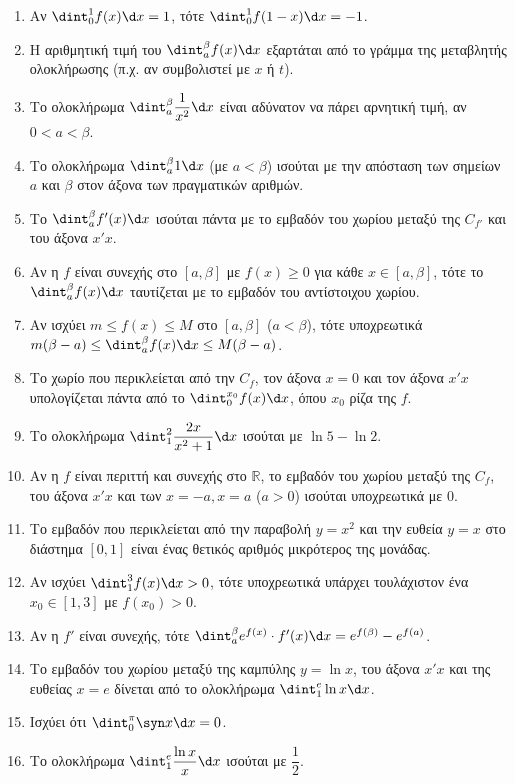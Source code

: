 \begin{enumerate}[label=\textbf{3.\arabic*.}]
    \item Αν $\dint_0^1 f(x)\d x = 1$, τότε $\dint_0^1 f(1-x)\d x = -1$.
    \item Η αριθμητική τιμή του $\dint_{a}^{\beta} f(x) \d x$ εξαρτάται από το γράμμα της μεταβλητής ολοκλήρωσης (π.χ. αν συμβολιστεί με $x$ ή $t$).
    \item Το ολοκλήρωμα $\dint_a^\beta \dfrac{1}{x^2} \d x$ είναι αδύνατον να πάρει αρνητική τιμή, αν $0 < a < \beta$.
    \item Το ολοκλήρωμα $\dint_{a}^{\beta} 1 \d x$ (με $a<\beta$) ισούται με την απόσταση των σημείων $a$ και $\beta$ στον άξονα των πραγματικών αριθμών.
    \item Το $\dint_{a}^{\beta} f'(x) \d x$ ισούται πάντα με το εμβαδόν του χωρίου μεταξύ της $C_{f'}$ και του άξονα $x'x$.
    \item Αν η $f$ είναι συνεχής στο $[a, \beta]$ με $f(x) \ge 0$ για κάθε $x \in [a, \beta]$, τότε το $\dint_a^\beta f(x) \d x$ ταυτίζεται με το εμβαδόν του αντίστοιχου χωρίου.
    \item Αν ισχύει $m \le f(x) \le M$ στο $[a, \beta]$ ($a<\beta$), τότε υποχρεωτικά $m(\beta-a) \le \dint_{a}^{\beta} f(x)\d x \le M(\beta-a)$.
    \item Το χωρίο που περικλείεται από την $C_f$, τον άξονα $x=0$ και τον άξονα $x'x$ υπολογίζεται πάντα από το $\dint_0^{x_0} f(x)\d x$, όπου $x_0$ ρίζα της $f$.
    \item Το ολοκλήρωμα $\dint_1^2 \dfrac{2x}{x^2+1} \d x$ ισούται με $\ln 5 - \ln 2$.
    \item Αν η $f$ είναι περιττή και συνεχής στο $\mathbb{R}$, το εμβαδόν του χωρίου μεταξύ της $C_f$, του άξονα $x'x$ και των $x=-a, x=a$ ($a>0$) ισούται υποχρεωτικά με $0$.
    \item Το εμβαδόν που περικλείεται από την παραβολή $y=x^2$ και την ευθεία $y=x$ στο διάστημα $[0,1]$ είναι ένας θετικός αριθμός μικρότερος της μονάδας.
    \item Αν ισχύει $\dint_1^3 f(x) \d x > 0$, τότε υποχρεωτικά υπάρχει τουλάχιστον ένα $x_0 \in [1,3]$ με $f(x_0) > 0$.
    \item Αν η $f'$ είναι συνεχής, τότε $\dint_{a}^{\beta} e^{f(x)} \cdot f'(x) \d x = e^{f(\beta)} - e^{f(a)}$.
    \item Το εμβαδόν του χωρίου μεταξύ της καμπύλης $y=\ln x$, του άξονα $x'x$ και της ευθείας $x=e$ δίνεται από το ολοκλήρωμα $\dint_1^e \ln x \d x$.
    \item Ισχύει ότι $\dint_0^{\pi} \syn x \d x = 0$.
    \item Το ολοκλήρωμα $\dint_1^e \dfrac{\ln x}{x} \d x$ ισούται με $\dfrac{1}{2}$.

\end{enumerate}
